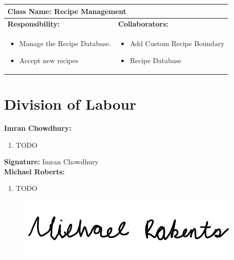 \documentclass[]{article}
\begin{document}
\begin{table}[H]
	\centering
	\begin{tabular}{|p{7cm}|p{7cm}|}
	\hline 
	 \multicolumn{2}{|l|}{\textbf{Class Name: Recipe Management}} \\
	\hline
	\textbf{Responsibility:} & \textbf{Collaborators:} \\
	\hline
	\raggedright
	\begin{itemize}
		\item Manage the Recipe Database.
		\item Accept new recipes
	\end{itemize}
	\vspace{1in} & 
	\begin{itemize}
		\item Add Custom Recipe Boundary
		\item Recipe Database
	\end{itemize} \\
	\hline
	\end{tabular}
\end{table}



\appendix
\section{Division of Labour}
\label{sec:division_of_labour}
\textbf{Imran Chowdhury:}
\begin{enumerate}
	\item TODO
\end{enumerate}

\textbf{Signature:} Imran Chowdhury \\

\textbf{Michael Roberts:}
\begin{enumerate}
	\item TODO
\end{enumerate}

\begin{figure}[H]
 	\centering
    \includegraphics[width=\textwidth]{image/A_Michael_Roberts_Signature.png}
\end{figure}
\end{document}
